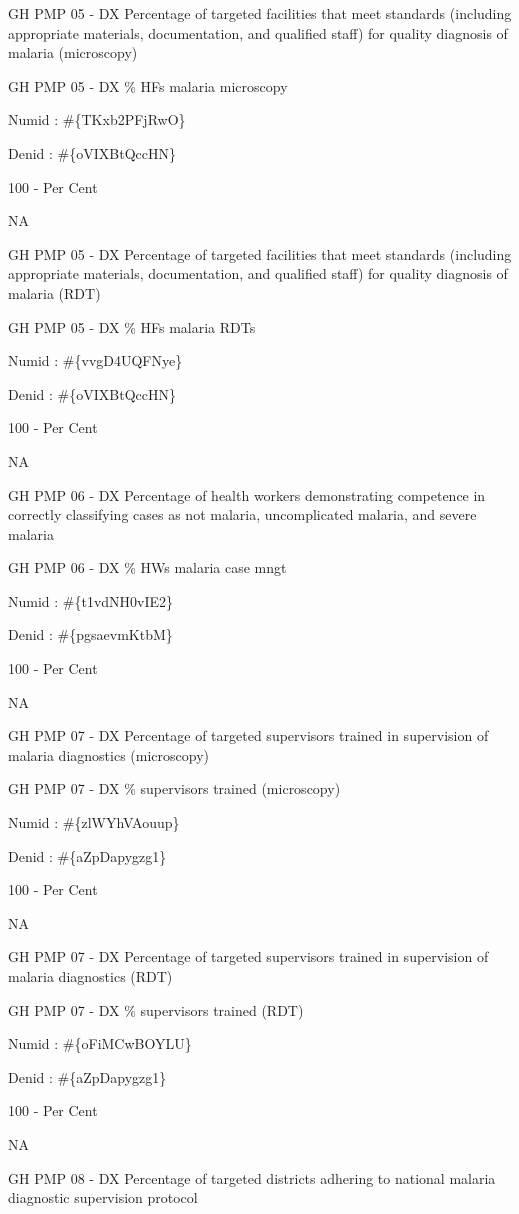\documentclass[]{book}
\begin{document}
GH PMP 05 - DX Percentage of targeted facilities that meet standards (including appropriate materials, documentation, and qualified staff) for quality diagnosis of malaria (microscopy)

GH PMP 05 - DX \% HFs malaria microscopy

Numid : \#\{TKxb2PFjRwO\}

Denid : \#\{oVIXBtQccHN\}

100 - Per Cent

NA

GH PMP 05 - DX Percentage of targeted facilities that meet standards (including appropriate materials, documentation, and qualified staff) for quality diagnosis of malaria (RDT)

GH PMP 05 - DX \% HFs malaria RDTs

Numid : \#\{vvgD4UQFNye\}

Denid : \#\{oVIXBtQccHN\}

100 - Per Cent

NA

GH PMP 06 - DX Percentage of health workers demonstrating competence in correctly classifying cases as not malaria, uncomplicated malaria, and severe malaria

GH PMP 06 - DX \% HWs malaria case mngt

Numid : \#\{t1vdNH0vIE2\}

Denid : \#\{pgsaevmKtbM\}

100 - Per Cent

NA

GH PMP 07 - DX Percentage of targeted supervisors trained in supervision of malaria diagnostics (microscopy)

GH PMP 07 - DX \% supervisors trained (microscopy)

Numid : \#\{zlWYhVAouup\}

Denid : \#\{aZpDapygzg1\}

100 - Per Cent

NA

GH PMP 07 - DX Percentage of targeted supervisors trained in supervision of malaria diagnostics (RDT)

GH PMP 07 - DX \% supervisors trained (RDT)

Numid : \#\{oFiMCwBOYLU\}

Denid : \#\{aZpDapygzg1\}

100 - Per Cent

NA

GH PMP 08 - DX Percentage of targeted districts adhering to national malaria diagnostic supervision protocol
\end{document}
